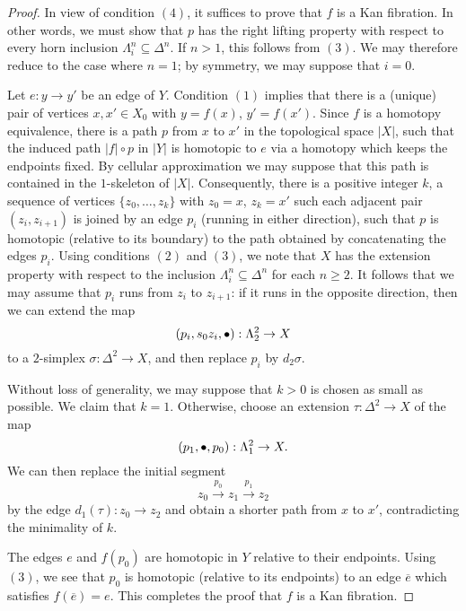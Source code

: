 \begin{proof}
In view of condition $(4)$, it suffices to prove that $f$ is a Kan fibration. In other words, we must show that $p$ has the right lifting property with respect to every horn inclusion $\Lambda^n_i \subseteq \Delta^n$. If $n > 1$, this follows from $(3)$. We may therefore reduce to the case where $n=1$; by symmetry, we may suppose that $i=0$.

Let $e: y \rightarrow y'$ be an edge of $Y$. Condition $(1)$ implies that there is a (unique) pair of vertices $x,x' \in X_0$ with $y=f(x)$, $y' = f(x')$.
Since $f$ is a homotopy equivalence, there is a path $p$ from $x$ to $x'$ in the topological space $|X|$, such that the induced path $|f| \circ p$ in $|Y|$ is homotopic to $e$ via a homotopy which keeps the endpoints fixed. By cellular approximation we may suppose that this path is contained in the $1$-skeleton of $|X|$. 
Consequently, there is a positive integer $k$, a sequence
of vertices $\{ z_0, \ldots, z_k \}$ with $z_0 = x$, $z_k = x'$ such
each adjacent pair $(z_i, z_{i+1})$ is joined by an edge $p_{i}$ (running in either direction), such that $p$ is homotopic (relative to its boundary) to the path obtained by concatenating the edges $p_i$. Using conditions $(2)$ and $(3)$, we note that $X$ has the extension property with respect to the inclusion $\Lambda^n_i \subseteq \Delta^n$ for each $n \geq 2$.
It follows that we may assume that
$p_i$ runs from $z_i$ to $z_{i+1}$: if it runs in the opposite direction, then we can extend the map $$(p_i, s_0 z_i, \bullet): \Lambda^2_2 \rightarrow X$$ to a $2$-simplex
$\sigma: \Delta^2 \rightarrow X$, and then replace $p_i$ by $d_2 \sigma$.

Without loss of generality, we may suppose that $k > 0$ is chosen as small as possible.
We claim that $k = 1$. Otherwise, choose an extension $\tau: \Delta^2 \rightarrow X$ of the map
$$ (p_1, \bullet, p_0 ): \Lambda^2_1 \rightarrow X.$$
We can then replace the initial segment
$$ z_0 \stackrel{p_0}{\rightarrow} z_1 \stackrel{p_1}{\rightarrow} z_2$$
by the edge $d_1(\tau): z_0 \rightarrow z_2$ and obtain a shorter path from $x$ to $x'$, contradicting the minimality of $k$. 

The edges $e$ and $f(p_0)$ are homotopic in $Y$ relative to their endpoints. Using $(3)$, we see that $p_0$ is homotopic (relative to its endpoints) to an edge $\overline{e}$ which satisfies $f(\overline{e}) = e$. This completes the proof that $f$ is a Kan fibration.
\end{proof}

